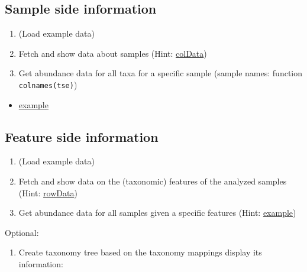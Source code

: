 \documentclass[
]{book}
\providecommand{\tightlist}{%
  \setlength{\itemsep}{0pt}\setlength{\parskip}{0pt}}
\begin{document}
\hypertarget{sample-side-information}{%
\subsection{Sample side information}\label{sample-side-information}}

\begin{enumerate}
\def\labelenumi{\arabic{enumi}.}
\tightlist
\item
  (Load example data)
\item
  Fetch and show data about samples (Hint: \href{https://microbiome.github.io/OMA/containers.html\#coldata}{colData})
\item
  Get abundance data for all taxa for a specific sample (sample names: function \texttt{colnames(tse)})
\end{enumerate}

\begin{itemize}
\tightlist
\item
  \href{https://microbiome.github.io/OMA/taxonomic-information.html\#abundances-of-all-taxa-in-specific-sample}{example}
\end{itemize}

\hypertarget{feature-side-information}{%
\subsection{Feature side information}\label{feature-side-information}}

\begin{enumerate}
\def\labelenumi{\arabic{enumi}.}
\tightlist
\item
  (Load example data)
\item
  Fetch and show data on the (taxonomic) features of the analyzed samples (Hint: \href{https://microbiome.github.io/OMA/containers.html\#rowdata}{rowData})
\item
  Get abundance data for all samples given a specific features (Hint: \href{https://microbiome.github.io/OMA/taxonomic-information.html\#abundances-of-specific-taxa-in-all-samples}{example})
\end{enumerate}

Optional:

\begin{enumerate}
\def\labelenumi{\arabic{enumi}.}
\setcounter{enumi}{3}
\tightlist
\item
  Create taxonomy tree based on the taxonomy mappings display its information:
\end{enumerate}
\end{document}
